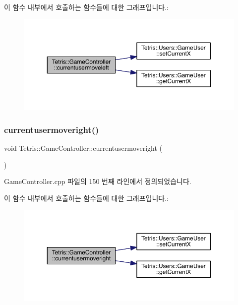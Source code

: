 이 함수 내부에서 호출하는 함수들에 대한 그래프입니다.\+:
\nopagebreak
\begin{figure}[H]
\begin{center}
\leavevmode
\includegraphics[width=350pt]{class_tetris_1_1_game_controller_ac0d40a0936505754131099034b4271fa_cgraph}
\end{center}
\end{figure}
\mbox{\label{class_tetris_1_1_game_controller_a1d2859507cbc9bf9789753228cdedc1f}} 
\subsubsection{\texorpdfstring{currentusermoveright()}{currentusermoveright()}\hspace{0.1cm}{\footnotesize\ttfamily [1/2]}}
{\footnotesize\ttfamily void Tetris\+::\+Game\+Controller\+::currentusermoveright (\begin{DoxyParamCaption}{ }\end{DoxyParamCaption})}



Game\+Controller.\+cpp 파일의 150 번째 라인에서 정의되었습니다.

이 함수 내부에서 호출하는 함수들에 대한 그래프입니다.\+:
\nopagebreak
\begin{figure}[H]
\begin{center}
\leavevmode
\includegraphics[width=350pt]{class_tetris_1_1_game_controller_a1d2859507cbc9bf9789753228cdedc1f_cgraph}
\end{center}
\end{figure}
\mbox{\label{class_tetris_1_1_game_controller_a1d2859507cbc9bf9789753228cdedc1f}} 
